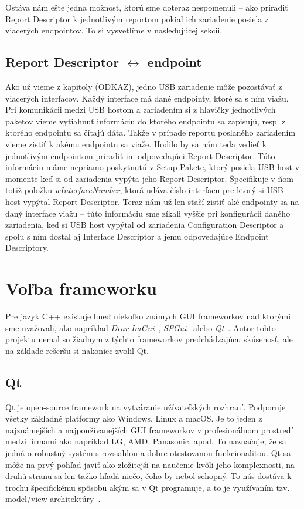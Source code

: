 Ostáva nám ešte jedna možnosť, ktorú sme doteraz nespomenuli -- ako priradiť Report Descriptor k jednotlivým reportom pokiaľ ich zariadenie posiela z viacerých endpointov. To si vysvetlíme v nasledujúcej sekcii.

\subsection*{Report Descriptor $\longleftrightarrow$ endpoint}
Ako už vieme z kapitoly (ODKAZ), jedno USB zariadenie môže pozostávať z viacerých interfacov. Každý interface má dané endpointy, ktoré sa s ním viažu. Pri komunikácii medzi USB hostom a zariadením si z hlavičky jednotlivých paketov vieme vytiahnuť informáciu do ktorého endpointu sa zapisujú, resp. z ktorého endpointu sa čítajú dáta. Takže v prípade reportu poslaného zariadením vieme zistiť k akému endpointu sa viaže. Hodilo by sa nám teda vedieť k jednotlivým endpointom priradiť im odpovedajúci Report Descriptor. Túto informáciu máme nepriamo poskytnutú v Setup Pakete, ktorý posiela USB host v momente keď si od zariadenia vypýta jeho Report Descriptor. Špecifikuje v ňom totiž položku \textit{wInterfaceNumber}, ktorá udáva číslo interfacu pre ktorý si USB host vypýtal Report Descriptor. Teraz nám už len stačí zistiť aké endpointy sa na daný interface viažu -- túto informáciu sme zíkali vyššie pri konfigurácii daného zariadenia, keď si USB host vypýtal od zariadenia Configuration Descriptor a spolu s ním dostal aj Interface Descriptor a jemu odpovedajúce Endpoint Descriptory.



\section{Voľba frameworku}
Pre jazyk C++ existuje hneď niekoľko známych GUI frameworkov nad ktorými sme uvažovali, ako napríklad \textit{Dear ImGui}~\cite{dearimgui}, \textit{SFGui}~\cite{sfgui} alebo \textit{Qt}~\cite{qt}. Autor tohto projektu nemal so žiadnym z týchto frameworkov predchádzajúcu skúsenosť, ale na základe rešeršu si nakoniec zvolil Qt.

\subsection*{Qt}
Qt je open-source framework na vytváranie užívateľských rozhraní. Podporuje všetky základné platformy ako Windows, Linux a macOS. Je to jeden z najznámejších a najpoužívanejších GUI frameworkov v profesionálnom prostredí medzi firmami ako napríklad LG, AMD, Panasonic, apod. To naznačuje, že sa jedná o robustný systém s rozsiahlou a dobre otestovanou funkcionalitou. Qt sa môže na prvý pohľad javiť ako zložitejši na naučenie kvôli jeho komplexnosti, na druhú stranu sa len ťažko hľadá niečo, čoho by nebol schopný. To nás dostáva k trochu špecifickému spôsobu akým sa v Qt programuje, a to je využívaním tzv. model/view architektúry~\cite{qt_model_view}.

